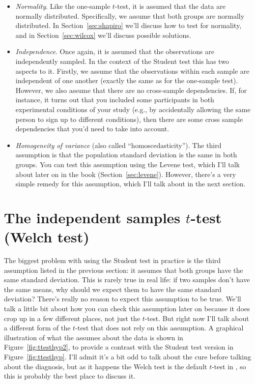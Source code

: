 \begin{itemize}
\item {\it Normality}. Like the one-sample $t$-test, it is assumed that the data are normally distributed. Specifically, we assume that both groups are normally distributed. In Section~\ref{sec:shapiro} we'll discuss how to test for normality, and in Section~\ref{sec:wilcox} we'll discuss possible solutions.
\item {\it Independence}. Once again, it is assumed that the observations are independently sampled. In the context of the Student test this has two aspects to it. Firstly, we assume that the observations within each sample are independent of one another (exactly the same as for the one-sample test). However, we also assume that there are no cross-sample dependencies. If, for instance, it turns out that you included some participants in both experimental conditions of your study (e.g., by accidentally allowing the same person to sign up to different conditions), then there are some cross sample dependencies that you'd need to take into account.
\item {\it Homogeneity of variance} (also called ``homoscedasticity''). The third assumption is that the population standard deviation is the same in both groups. You can test this assumption using the Levene test, which I'll talk about later on in the book (Section~\ref{sec:levene}). However, there's a very simple remedy for this assumption, which I'll talk about in the next section.
\end{itemize}





\section{The independent samples $t$-test (Welch test)~\label{sec:welchttest}}

The biggest problem with using the Student test in practice is the third assumption listed in the previous section: it assumes that both groups have the same standard deviation. This is rarely true in real life: if two samples don't have the same means, why should we expect them to have the same standard deviation? There's really no reason to expect this assumption to be true. We'll talk a little bit about how you can check this assumption later on because it does crop up in a few different places, not just the $t$-test. But right now I'll talk about a different form of the $t$-test \cite{Welch1947} that does not rely on this assumption. A graphical illustration of what the  assumes about the data is shown in Figure~\ref{fig:ttesthyp2}, to provide a contrast with the Student test version in Figure~\ref{fig:ttesthyp}. I'll admit it's a bit odd to talk about the cure before talking about the diagnosis, but as it happens the Welch test is the default $t$-test in \R, so this is probably the best place to discuss it. 

